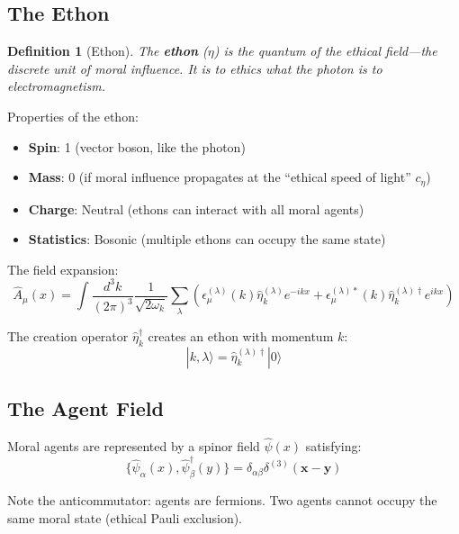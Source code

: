 \documentclass[12pt]{article}
\newtheorem{definition}{Definition}[section]
\begin{document}
\subsection{The Ethon}

\begin{definition}[Ethon]
The \textbf{ethon} ($\eta$) is the quantum of the ethical field---the discrete unit of moral influence. It is to ethics what the photon is to electromagnetism.
\end{definition}

Properties of the ethon:

\begin{itemize}
    \item \textbf{Spin}: 1 (vector boson, like the photon)
    \item \textbf{Mass}: 0 (if moral influence propagates at the ``ethical speed of light'' $c_\eta$)
    \item \textbf{Charge}: Neutral (ethons can interact with all moral agents)
    \item \textbf{Statistics}: Bosonic (multiple ethons can occupy the same state)
\end{itemize}

The field expansion:
\begin{equation}
    \hat{A}_\mu(x) = \int \frac{d^3k}{(2\pi)^3} \frac{1}{\sqrt{2\omega_k}} \sum_\lambda \left( \epsilon_\mu^{(\lambda)}(k) \hat{\eta}_k^{(\lambda)} e^{-ikx} + \epsilon_\mu^{(\lambda)*}(k) \hat{\eta}_k^{(\lambda)\dagger} e^{ikx} \right)
\end{equation}

The creation operator $\hat{\eta}_k^\dagger$ creates an ethon with momentum $k$:
\begin{equation}
    |k, \lambda\rangle = \hat{\eta}_k^{(\lambda)\dagger} |0\rangle
\end{equation}

\subsection{The Agent Field}

Moral agents are represented by a spinor field $\hat{\psi}(x)$ satisfying:
\begin{equation}
    \{\hat{\psi}_\alpha(x), \hat{\psi}_\beta^\dagger(y)\} = \delta_{\alpha\beta} \delta^{(3)}(\mathbf{x} - \mathbf{y})
\end{equation}

Note the anticommutator: agents are fermions. Two agents cannot occupy the same moral state (ethical Pauli exclusion).
\end{document}
